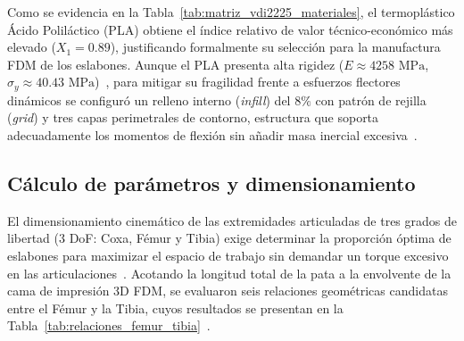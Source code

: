Como se evidencia en la Tabla~\ref{tab:matriz_vdi2225_materiales}, el termoplástico Ácido Poliláctico (PLA) obtiene el índice relativo de valor técnico-económico más elevado ($X_1 = 0.89$), justificando formalmente su selección para la manufactura FDM de los eslabones. Aunque el PLA presenta alta rigidez ($E \approx 4258\text{ MPa}$, $\sigma_y \approx 40.43\text{ MPa}$)~\cite{Anderson2017_PLA}, para mitigar su fragilidad frente a esfuerzos flectores dinámicos se configuró un relleno interno (\textit{infill}) del $8\%$ con patrón de rejilla (\textit{grid}) y tres capas perimetrales de contorno, estructura que soporta adecuadamente los momentos de flexión sin añadir masa inercial excesiva~\cite{MahovicPoljacek2025_PLA}.

\subsection{Cálculo de parámetros y dimensionamiento}

El dimensionamiento cinemático de las extremidades articuladas de tres grados de libertad (3 DoF: Coxa, Fémur y Tibia) exige determinar la proporción óptima de eslabones para maximizar el espacio de trabajo sin demandar un torque excesivo en las articulaciones~\cite{N20_Datasheet}. Acotando la longitud total de la pata a la envolvente de la cama de impresión 3D FDM, se evaluaron seis relaciones geométricas candidatas entre el Fémur y la Tibia, cuyos resultados se presentan en la Tabla~\ref{tab:relaciones_femur_tibia}~\cite{Wang2024_SpiderLegDesign}.


